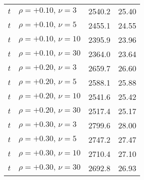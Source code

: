 \begin{table}[t]
\begin{tabular}{l l r r}
    $t$ & $\rho=+0.10,\,\nu=3$ & 2540.2 & 25.40 \\
    $t$ & $\rho=+0.10,\,\nu=5$ & 2455.1 & 24.55 \\
    $t$ & $\rho=+0.10,\,\nu=10$ & 2395.9 & 23.96 \\
    $t$ & $\rho=+0.10,\,\nu=30$ & 2364.0 & 23.64 \\
    $t$ & $\rho=+0.20,\,\nu=3$ & 2659.7 & 26.60 \\
    $t$ & $\rho=+0.20,\,\nu=5$ & 2588.1 & 25.88 \\
    $t$ & $\rho=+0.20,\,\nu=10$ & 2541.6 & 25.42 \\
    $t$ & $\rho=+0.20,\,\nu=30$ & 2517.4 & 25.17 \\
    $t$ & $\rho=+0.30,\,\nu=3$ & 2799.6 & 28.00 \\
    $t$ & $\rho=+0.30,\,\nu=5$ & 2747.2 & 27.47 \\
    $t$ & $\rho=+0.30,\,\nu=10$ & 2710.4 & 27.10 \\
    $t$ & $\rho=+0.30,\,\nu=30$ & 2692.8 & 26.93 \\
    \bottomrule
  \end{tabular}
\end{table}
